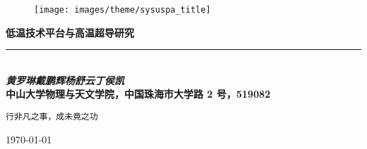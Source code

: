 
\begin{titlepage}
	\parindent=0pt
	
	\hspace*{\fill} %
	
	\vspace{2em} %
	
	\begin{figure}[h!]
		\centering
		\texttt{[image: images/theme/sysuspa\_title]}
	\end{figure}
	
	
	\vspace{5em} %
	
	\begin{flushright}
		{ \Huge \bfseries 低温技术平台与高温超导研究} \hspace*{6em} \\[0.3cm]
		
		\rule{0.618\textwidth}{6pt} \hspace*{6em} \\[0.4cm]
		
		\LARGE\emph{\textbf{黄罗琳\quad 戴鹏辉\quad 杨舒云\quad 丁侯凯}} \hspace*{4.1em}	\\[0.7cm]
		
		\large\textbf{中山大学物理与天文学院，中国珠海市大学路 2 号，519082} \hspace*{5em}
		
	\end{flushright}
	
	\begin{center}
		\vfill
		
		\Large\texttt{\textcolor{fgrayblue}{\kaishu 行非凡之事，成未竟之功}} %
		
		\hspace*{\fill}
		
		{\LARGE \today}
		
		\hspace*{\fill}
	\end{center}
	
\end{titlepage}